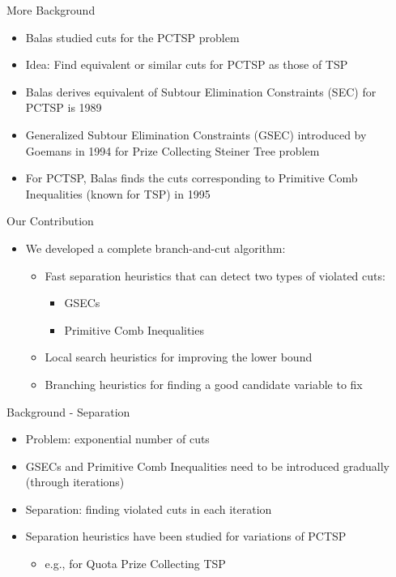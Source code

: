 \documentclass[10pt]{beamer}
\begin{document}
\begin{frame}[fragile]{More Background}
\begin{itemize}
    \item<3-> Balas studied cuts for the PCTSP problem
    \item<4-> Idea: Find equivalent or similar cuts for PCTSP as those of TSP
    \item<1-> Balas derives equivalent of Subtour Elimination Constraints (SEC) for PCTSP is 1989 \cite{Balas89}
    \item<2-> \alert{Generalized Subtour Elimination Constraints (GSEC)} introduced by Goemans in 1994 \cite{Goemans94} for Prize Collecting Steiner Tree problem
    \item<3-> For PCTSP, Balas finds the cuts corresponding to \alert{Primitive Comb Inequalities} (known for TSP) in 1995 \cite{Balas95}
\end{itemize}
\end{frame}


\begin{frame}{Our Contribution}
\begin{itemize}
    \item<1-> We developed a complete branch-and-cut algorithm:
    \begin{itemize}
        \item<2-> Fast separation heuristics that can detect two types of violated cuts:
        \begin{itemize}
            \item<3-> GSECs
            \item<4-> Primitive Comb Inequalities
        \end{itemize}
        \item<5-> Local search heuristics for improving the lower bound
        \item<6-> Branching heuristics for finding a good candidate variable to fix
    \end{itemize}
\end{itemize}
\end{frame}



\begin{frame}[fragile]{Background - Separation}
\begin{itemize}
\item<1-> Problem: exponential number of cuts
\item<2-> GSECs and Primitive Comb Inequalities need to be introduced gradually (through iterations)
\item<3-> \alert{Separation:} finding violated cuts in each iteration
\item<4-> Separation heuristics have been studied for variations of PCTSP
\begin{itemize}
\item<5-> e.g., for Quota Prize Collecting TSP \cite{Berube09}
\end{itemize}
\end{itemize}
\end{frame}
\end{document}
